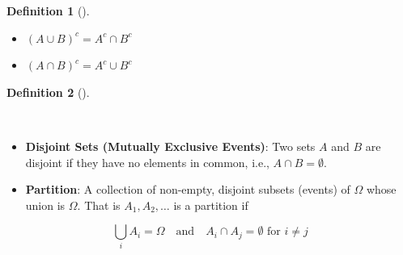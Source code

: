 \documentclass[
  letterpaper,
  DIV=11,
  numbers=noendperiod]{scrreport}
\providecommand{\tightlist}{%
  \setlength{\itemsep}{0pt}\setlength{\parskip}{0pt}}
\theoremstyle{definition}
\theoremstyle{plain}
\theoremstyle{definition}
\newtheorem{definition}{Definition}[chapter]
\theoremstyle{plain}
\theoremstyle{remark}
\begin{document}
\begin{tcolorbox}
\begin{definition}[]
\begin{itemize}
  \begin{itemize}
  \tightlist
  \item
    \((A \cup B)^c = A^c \cap B^c\)
  \item
    \((A \cap B)^c = A^c \cup B^c\)
  \end{itemize}
\end{itemize}

\end{definition}

\end{tcolorbox}

\begin{tcolorbox}[enhanced jigsaw, breakable, opacityback=0, leftrule=.75mm, colback=white, bottomtitle=1mm, coltitle=black, toptitle=1mm, titlerule=0mm, bottomrule=.15mm, colframe=quarto-callout-note-color-frame, title={Disjoint Sets and Partitions of Sample Space}, opacitybacktitle=0.6, colbacktitle=quarto-callout-note-color!10!white, rightrule=.15mm, arc=.35mm, toprule=.15mm, left=2mm]

\begin{definition}[]\protect\hypertarget{def-disjoint-partition}{}\label{def-disjoint-partition}

~

\begin{itemize}
\item
  \textbf{Disjoint Sets (Mutually Exclusive Events)}: Two sets \(A\) and
  \(B\) are disjoint if they have no elements in common, i.e.,
  \(A \cap B = \emptyset\).
\item
  \textbf{Partition}: A collection of non-empty, disjoint subsets
  (events) of \(\Omega\) whose union is \(\Omega\). That is
  \(A_1,A_2, \ldots\) is a partition if
\end{itemize}

\[
\bigcup_{i} A_i = \Omega \quad \text{and} \quad A_i \cap A_j = \emptyset \text{ for } i \ne j
\]

\end{definition}

\end{tcolorbox}
\end{document}
